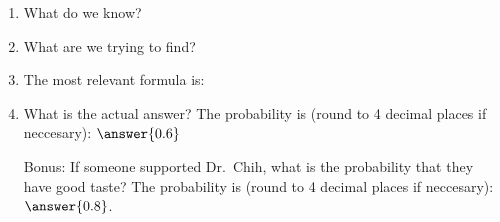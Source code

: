 \documentclass{ximera}
\begin{document}
 
 \begin{enumerate}
\item What do we know?

\begin{selectAll}

\end{selectAll}

\item What are we trying to find?

\begin{multipleChoice}




\end{multipleChoice}

\item The most relevant formula is:

\begin{multipleChoice}
\end{multipleChoice}

\item What is the actual answer?  The probability is (round to 4 decimal places if neccesary): $\answer{0.6}$

\item[Bonus:] If someone supported Dr.\ Chih, what is the probability that they have good taste?  The probability is (round to 4 decimal places if neccesary): $\answer{0.8}$.

\end{enumerate}

 
 
 
 
      
\end{document}
